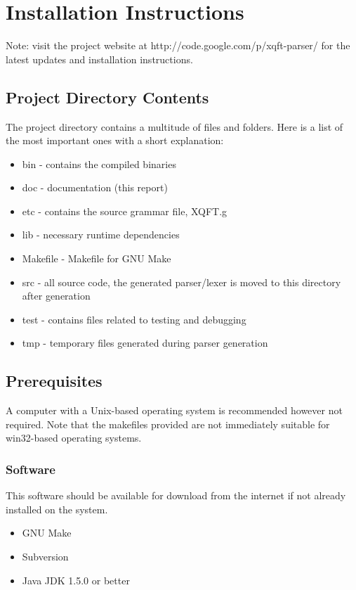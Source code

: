 \chapter{Installation Instructions}
Note: visit the project website at http://code.google.com/p/xqft-parser/
for the latest updates and installation instructions.

\section*{Project Directory Contents}
The project directory contains a multitude of files and folders. Here is a list
of the most important ones with a short explanation:
\begin{itemize}
  \item bin - contains the compiled binaries
  \item doc - documentation (this report)
  \item etc - contains the source grammar file, XQFT.g
  \item lib - necessary runtime dependencies
  \item Makefile - Makefile for GNU Make
  \item src - all source code, the generated parser/lexer is moved to this
  directory after generation
  \item test - contains files related to testing and debugging
  \item tmp - temporary files generated during parser generation
\end{itemize}

\section*{Prerequisites}
A computer with a Unix-based operating system is recommended however not
required. Note that the makefiles provided are not immediately suitable for
win32-based operating systems.

\subsection*{Software}
This software should be available for download from the internet if not already
installed on the system.

\begin{itemize}
  \item GNU Make
  \item Subversion
  \item Java JDK 1.5.0 or better
\end{itemize}

